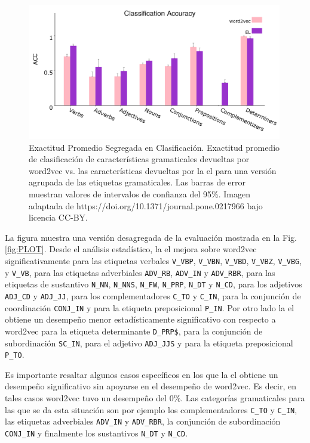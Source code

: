 {\begin{figure}[ht!]
    \centering
    \includegraphics[width=0.99\textwidth]{PLOT3.png}
    \caption{Exactitud Promedio Segregada en Clasificación. Exactitud promedio de clasificación de características gramaticales devueltas por word2vec vs. las características devueltas por la \gls{el} para una versión agrupada de las etiquetas gramaticales. Las barras de error muestran valores de intervalos de confianza del 95\%. Imagen adaptada de https://doi.org/10.1371/journal.pone.0217966 bajo licencia CC-BY.}
    \label{fig:PLOT3}
\end{figure}

La figura muestra una versión desagregada de la evaluación mostrada en la Fig. \ref{fig:PLOT}.
Desde el análisis estadístico, la \gls{el} mejora sobre word2vec significativamente para las etiquetas verbales
\texttt{V\_VBP}, \texttt{V\_VBN}, \texttt{V\_VBD}, \texttt{V\_VBZ}, \texttt{V\_VBG}, y \texttt{V\_VB},
para las etiquetas adverbiales \texttt{ADV\_RB}, \texttt{ADV\_IN} y \texttt{ADV\_RBR},
para las etiquetas de sustantivo \texttt{N\_NN}, \texttt{N\_NNS}, \texttt{N\_FW}, \texttt{N\_PRP}, \texttt{N\_DT} y \texttt{N\_CD},
para los adjetivos \texttt{ADJ\_CD} y \texttt{ADJ\_JJ},
para los complementadores \texttt{C\_TO}  y  \texttt{C\_IN}, para la conjunción de coordinación \texttt{CONJ\_IN} y para la etiqueta preposicional \texttt{P\_IN}.
Por otro lado la \gls{el} obtiene un desempeño menor estadísticamente significativo con respecto a word2vec para la etiqueta determinante
\texttt{D\_PRP\$}, para la conjunción de subordinación \texttt{SC\_IN}, para el adjetivo \texttt{ADJ\_JJS} y para la etiqueta preposicional \texttt{P\_TO}.

Es importante resaltar algunos casos específicos en los que la \gls{el} obtiene un desempeño significativo sin apoyarse en el desempeño de word2vec.
Es decir, en tales casos word2vec tuvo un desempeño del 0\%.
Las categorías gramaticales para las que se da esta situación son por ejemplo los complementadores \texttt{C\_TO} y  \texttt{C\_IN}, las etiquetas adverbiales \texttt{ADV\_IN} y \texttt{ADV\_RBR}, la conjunción de subordinación \texttt{CONJ\_IN} y finalmente los sustantivos \texttt{N\_DT} y \texttt{N\_CD}.


}
